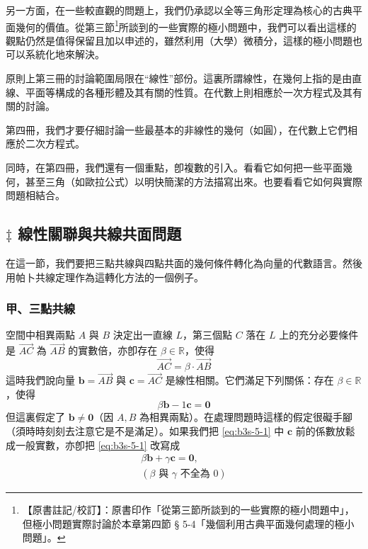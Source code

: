 另一方面，在一些較直觀的問題上，我們仍承認以全等三角形定理為核心的古典平面幾何的價值。從第三節\label{note:b3s-ch5-p224-sec-ref}\footnote{【原書註記/校訂】：原書印作「從第三節所談到的一些實際的極小問題中」，但極小問題實際討論於本章第四節 § 5-4「幾個利用古典平面幾何處理的極小問題」。}所談到的一些實際的極小問題中，我們可以看出這樣的觀點仍然是值得保留且加以申述的，雖然利用（大學）微積分，這樣的極小問題也可以系統化地來解決。

原則上第三冊的討論範圍局限在“線性”部份。這裏所謂線性，在幾何上指的是由直線、平面等構成的各種形體及其有關的性質。在代數上則相應於一次方程式及其有關的討論。

第四冊，我們才要仔細討論一些最基本的非線性的幾何（如圓），在代數上它們相應於二次方程式。

同時，在第四冊，我們還有一個重點，卽複數的引入。看看它如何把一些平面幾何，甚至三角（如歐拉公式）以明快簡潔的方法描寫出來。也要看看它如何與實際問題相結合。

\subsection{\texorpdfstring{$\ddagger$ }{‡ }線性關聯與共線共面問題}\label{sec:b3s-5-1}

在這一節，我們要把三點共線與四點共面的幾何條件轉化為向量的代數語言。然後用帕卜共線定理作為這轉化方法的一個例子。

\subsubsection*{甲、三點共線}

空間中相異兩點 $A$ 與 $B$ 決定出一直線 $L$，第三個點 $C$ 落在 $L$ 上的充分必要條件是 $\vec{AC}$ 為 $\vec{AB}$ 的實數倍，亦卽存在 $\beta \in \mathbb{R}$，使得
\[ \vec{AC} = \beta \cdot \vec{AB} \]
這時我們說向量 $\mathbf{b} = \vec{AB}$ 與 $\mathbf{c} = \vec{AC}$ 是線性相關。它們滿足下列關係：存在 $\beta \in \mathbb{R}$，使得
\begin{equation}
\beta \mathbf{b} - 1\mathbf{c} = \mathbf{0} \label{eq:b3s-5-1}
\end{equation}
但這裏假定了 $\mathbf{b} \neq \mathbf{0}$（因 $A, B$ 為相異兩點）。在處理問題時這樣的假定很礙手腳（須時時刻刻去注意它是不是滿足）。如果我們把 \eqref{eq:b3s-5-1} 中 $\mathbf{c}$ 前的係數放鬆成一般實數，亦卽把 \eqref{eq:b3s-5-1} 改寫成
\begin{equation}
\begin{split}
\beta \mathbf{b} + \gamma \mathbf{c} = \mathbf{0}, \\
(\beta \text{ 與 } \gamma \text{ 不全為 } 0)
\end{split} \label{eq:b3s-5-2}
\end{equation}

